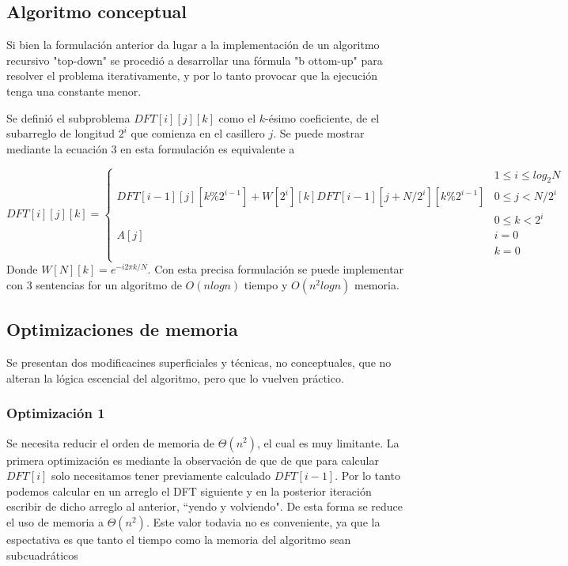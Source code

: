 \documentclass[assd_tp2_main.tex]{subfiles}
\begin{document}
\subsection{Algoritmo conceptual}
Si bien la formulación anterior da lugar a la implementación de un algoritmo recursivo "top-down" se procedió a desarrollar una fórmula "b ottom-up" para resolver el problema iterativamente, y por lo tanto provocar que la ejecución tenga una constante menor.

Se definió el subproblema $DFT[i][j][k]$ como el $k$-ésimo coeficiente, de el subarreglo de longitud $2^i$ que comienza en el casillero $j$. Se puede mostrar mediante la ecuación 3 en esta formulación es equivalente a

\begin{equation}
	DFT[i][j][k] = \begin{cases}
		 & 1\leq i \leq log_2{N} \\ DFT[i-1][j][k\%2^{i-1}] + W[2^i][k] DFT[i-1][j+N/2^{i}][k\%2^{i-1}] & 0\leq j < N/2^i \\ & 0\leq k<2^i \\
		A[j] & i = 0 \\ & k = 0 \\
\end{cases}
\end{equation}
Donde $W[N][k]=e^{-i2\pi k / N}$.
Con esta precisa formulación se puede implementar con 3 sentencias for un algoritmo de $O(nlog n)$ tiempo y $O(n^2log n)$ memoria.

\subsection{Optimizaciones de memoria}
Se presentan dos modificacines superficiales y técnicas, no conceptuales, que no alteran la lógica escencial del algoritmo, pero que lo vuelven práctico.
\subsubsection{Optimización 1}
Se necesita reducir el orden de memoria de $\Theta(n^2)$, el cual es muy limitante. La primera optimización es mediante la observación de que de que para calcular $DFT[i]$ solo necesitamos tener previamente calculado $DFT[i-1]$. Por lo tanto podemos calcular en un arreglo el DFT siguiente y en la posterior iteración escribir de dicho arreglo al anterior, ``yendo y volviendo". De esta forma se reduce el uso de memoria a $\Theta(n^2)$. Este valor todavia no es conveniente, ya que la espectativa es que tanto el tiempo como la memoria del algoritmo sean subcuadráticos
\end{document}

